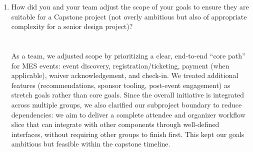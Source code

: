\documentclass{article}
\begin{document}
\begin{enumerate}
    \item How did you and your team adjust the scope of your goals to ensure
    they are suitable for a Capstone project (not overly ambitious but also of
    appropriate complexity for a senior design project)?
    \\
    \\
    \\As a team, we adjusted scope by prioritizing a clear, end-to-end ``core path'' for MES events: event discovery, registration/ticketing, payment (when applicable), waiver acknowledgement, and check-in. We treated additional features (recommendations, sponsor tooling, post-event engagement) as stretch goals rather than core goals. Since the overall initiative is integrated across multiple groups, we also clarified our subproject boundary to reduce dependencies: we aim to deliver a complete attendee and organizer workflow slice that can integrate with other components through well-defined interfaces, without requiring other groups to finish first. This kept our goals ambitious but feasible within the capstone timeline.
\end{enumerate}  
\end{document}
